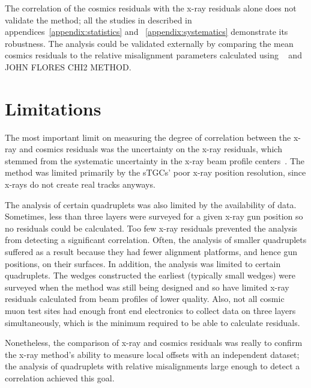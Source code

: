The correlation of the cosmics residuals with the x-ray residuals alone does not validate the method; all the studies in described in appendices~\ref{appendix:statistics} and ~\ref{appendix:systematics} demonstrate its robustness. The analysis could be validated externally by comparing the mean cosmics residuals to the relative misalignment parameters calculated using ~\cite{lefebvre_tgc_analysis} and JOHN FLORES CHI2 METHOD.

\section{Limitations}
The most important limit on measuring the degree of correlation between the x-ray and cosmics residuals was the uncertainty on the x-ray residuals, which stemmed from the systematic uncertainty in the x-ray beam profile centers~\cite{lefebvre_precision_2020}. The method was limited primarily by the sTGCs' poor x-ray position resolution, since x-rays do not create real tracks anyways. 

The analysis of certain quadruplets was also limited by the availability of data. Sometimes, less than three layers were surveyed for a given x-ray gun position so no residuals could be calculated. Too few x-ray residuals prevented the analysis from detecting a significant correlation. Often, the analysis of smaller quadruplets suffered as a result because they had fewer alignment platforms, and hence gun positions, on their surfaces. In addition, the analysis was limited to certain quadruplets. The wedges constructed the earliest (typically small wedges) were surveyed when the method was still being designed and so have limited x-ray residuals calculated from beam profiles of lower quality. Also, not all cosmic muon test sites had enough front end electronics to collect data on three layers simultaneously, which is the minimum required to be able to calculate residuals.

Nonetheless, the comparison of x-ray and cosmics residuals was really to confirm the x-ray method's ability to measure local offsets with an independent dataset; the analysis of quadruplets with relative misalignments large enough to detect a correlation achieved this goal.
